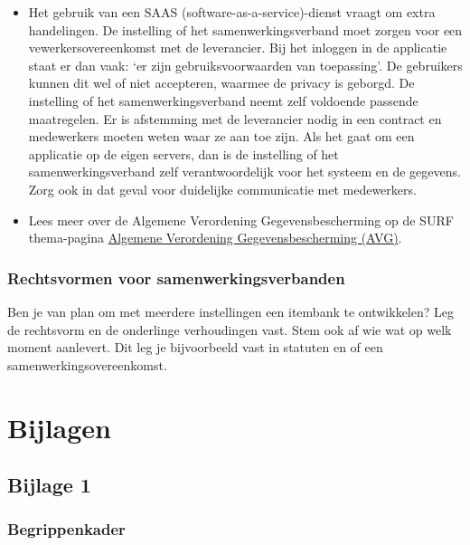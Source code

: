\documentclass[
]{book}
\providecommand{\tightlist}{%
  \setlength{\itemsep}{0pt}\setlength{\parskip}{0pt}}
\begin{document}
\begin{itemize}
\tightlist
\item
  Het gebruik van een SAAS (software-as-a-service)-dienst vraagt om extra handelingen. De instelling of het samenwerkingsverband moet zorgen voor een vewerkersovereenkomst met de leverancier. Bij het inloggen in de applicatie staat er dan vaak: `er zijn gebruiksvoorwaarden van toepassing'. De gebruikers kunnen dit wel of niet accepteren, waarmee de privacy is geborgd. De instelling of het samenwerkingsverband neemt zelf voldoende passende maatregelen. Er is afstemming met de leverancier nodig in een contract en medewerkers moeten weten waar ze aan toe zijn. Als het gaat om een applicatie op de eigen servers, dan is de instelling of het samenwerkingsverband zelf verantwoordelijk voor het systeem en de gegevens. Zorg ook in dat geval voor duidelijke communicatie met medewerkers.
\item
  Lees meer over de Algemene Verordening Gegevensbescherming op de SURF thema-pagina \href{https://www.surf.nl/algemene-verordening-gegevensbescherming-avg}{Algemene Verordening Gegevensbescherming (AVG)}.
\end{itemize}

\hypertarget{rechtsvormen-voor-samenwerkingsverbanden}{%
\subsection{Rechtsvormen voor samenwerkingsverbanden}\label{rechtsvormen-voor-samenwerkingsverbanden}}

Ben je van plan om met meerdere instellingen een itembank te ontwikkelen? Leg de rechtsvorm en de onderlinge verhoudingen vast. Stem ook af wie wat op welk moment aanlevert. Dit leg je bijvoorbeeld vast in statuten en of een samenwerkingsovereenkomst.

\hypertarget{bijlagen}{%
\chapter{Bijlagen}\label{bijlagen}}

\hypertarget{bijlage-1}{%
\section{Bijlage 1}\label{bijlage-1}}

\hypertarget{begrippenkader}{%
\subsection{Begrippenkader}\label{begrippenkader}}
\end{document}
